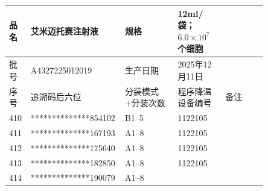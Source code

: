 \documentclass[UTF8,10pt,a4paper,fontset=fandol]{ctexart}
\newcommand{\fieldvalue}[1]{#1}
\begin{document}
\begin{center}
\small
\begin{tabular}{|p{0.07\linewidth}|p{0.24\linewidth}|p{0.20\linewidth}|p{0.18\linewidth}|p{0.16\linewidth}|}
\hline
品名 & 
\fieldvalue{艾米迈托赛注射液} &
规格 &
\fieldvalue{12ml/袋；$6.0\times10^{7}$个细胞} \\
\hline
批号 &
\fieldvalue{A4327225012019} &
生产日期 &
\fieldvalue{2025年12月11日} \\
\hline
序号 & 追溯码后六位 & 分装模式+分装次数 & 程序降温设备编号 & 备注 \\
\hline
\fieldvalue{410} &
\fieldvalue{**************854102} &
\fieldvalue{B1--5} &
\fieldvalue{1122105} & \\
\hline
\fieldvalue{411} &
\fieldvalue{**************167193} &
\fieldvalue{A1--8} &
\fieldvalue{1122105} & \\
\hline
\fieldvalue{412} &
\fieldvalue{**************175640} &
\fieldvalue{A1--8} &
\fieldvalue{1122105} & \\
\hline
\fieldvalue{413} &
\fieldvalue{**************182850} &
\fieldvalue{A1--8} &
\fieldvalue{1122105} & \\
\hline
\fieldvalue{414} &
\fieldvalue{**************190079} &
\fieldvalue{A1--8} &

\end{tabular}
\end{center}
\end{document}

